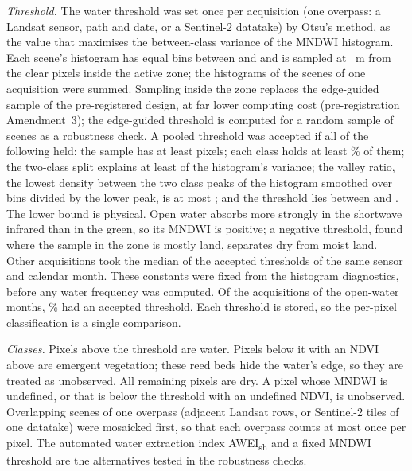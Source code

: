 \emph{Threshold.} The water threshold was set once per acquisition (one overpass: a Landsat sensor, path and date, or a Sentinel-2 datatake) by Otsu's method\citep{otsu1979}, as the value that maximises the between-class variance of the MNDWI histogram. Each scene's histogram has  equal bins between  and  and is sampled at ~m from the clear pixels inside the active zone; the histograms of the scenes of one acquisition were summed. Sampling inside the zone replaces the edge-guided sample of the pre-registered design, at far lower computing cost (pre-registration Amendment~3); the edge-guided threshold is computed for a random sample of  scenes as a robustness check. A pooled threshold was accepted if all of the following held: the sample has at least  pixels; each class holds at least \% of them; the two-class split explains at least  of the histogram's variance; the valley ratio, the lowest density between the two class peaks of the histogram smoothed over  bins divided by the lower peak, is at most ; and the threshold lies between  and . The lower bound is physical. Open water absorbs more strongly in the shortwave infrared than in the green, so its MNDWI is positive; a negative threshold, found where the sample in the zone is mostly land, separates dry from moist land. Other acquisitions took the median of the accepted thresholds of the same sensor and calendar month. These constants were fixed from the histogram diagnostics, before any water frequency was computed. Of the  acquisitions of the open-water months, \% had an accepted threshold. Each threshold is stored, so the per-pixel classification is a single comparison.

\emph{Classes.} Pixels above the threshold are water. Pixels below it with an NDVI above  are emergent vegetation; these reed beds hide the water's edge, so they are treated as unobserved. All remaining pixels are dry. A pixel whose MNDWI is undefined, or that is below the threshold with an undefined NDVI, is unobserved. Overlapping scenes of one overpass (adjacent Landsat rows, or Sentinel-2 tiles of one datatake) were mosaicked first, so that each overpass counts at most once per pixel. The automated water extraction index AWEI\textsubscript{sh}\citep{feyisa2014} and a fixed MNDWI threshold are the alternatives tested in the robustness checks.
